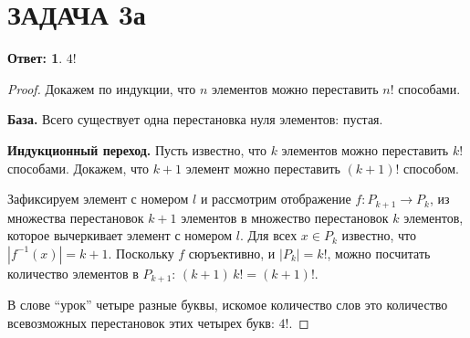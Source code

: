 \documentclass[a4paper]{article}
\theoremstyle{dotless}
\newtheorem*{answer}{Ответ:}
\begin{document}
\section*{ЗАДАЧА 3а}

\begin{answer}
$4!$ 
\end{answer}
\begin{proof}
Докажем по индукции, что $n$ элементов можно переставить $n!$ способами. 

{\bf База.} Всего существует одна перестановка нуля элементов: пустая.

{\bf Индукционный переход.} Пусть известно, что $k$ элементов можно переставить $k!$ способами. Докажем, что $k+1$ элемент можно переставить $(k+1)!$ способом.

Зафиксируем элемент с номером $l$ и рассмотрим отображение $f\colon P_{k+1}\to P_k$, из множества перестановок $k+1$ элементов в множество перестановок $k$ элементов, которое вычеркивает элемент с номером $l$. Для всех $x\in P_k$ известно, что $|f^{-1}(x)|=k+1$. Поскольку $f$ сюръективно, и $|P_k|=k!$, можно посчитать количество элементов в $P_{k+1}$: $(k+1)\,k!=(k+1)!$.
 
В слове \enquote{урок} четыре разные буквы, искомое количество слов это количество всевозможных перестановок этих четырех букв: $4!$.
\end{proof}
\end{document}
